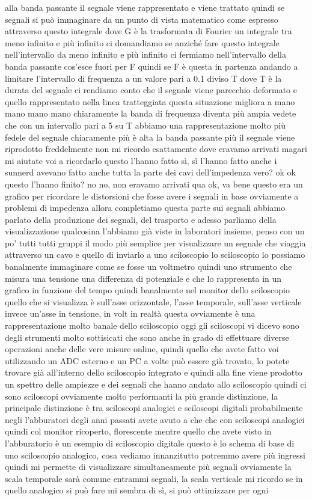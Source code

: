 {alla banda passante il segnale viene rappresentato e viene trattato quindi se segnali si può immaginare da un punto di vista matematico come espresso attraverso questo integrale dove G è la trasformata di Fourier un integrale tra meno infinito e più infinito ci domandiamo se anziché fare questo integrale nell'intervallo da meno infinito e più infinito ci fermiamo nell'intervallo della banda passante cos'esce fuori per F quindi se F è questa in partenza andando a limitare l'intervallo di frequenza a un valore pari a 0.1 diviso T dove T è la durata del segnale ci rendiamo conto che il segnale viene parecchio deformato e quello rappresentato nella linea tratteggiata questa situazione migliora a mano mano mano mano chiaramente la banda di frequenza diventa più ampia vedete che con un intervallo pari a 5 su T abbiamo una rappresentazione molto più fedele del segnale chiaramente più è alta la banda passante più il segnale viene riprodotto freddelmente non mi ricordo esattamente dove eravamo arrivati magari mi aiutate voi a ricordarlo questo l'hanno fatto sì, sì l'hanno fatto anche i sunnerd avevano fatto anche tutta la parte dei cavi dell'impedenza vero? ok ok questo l'hanno finito? no no, non eravamo arrivati qua ok, va bene questo era un grafico per ricordare le distorsioni che fosse avere i segnali in base ovviamente a problemi di impedenza allora completiamo questa parte sui segnali abbiamo parlato della produzione dei segnali, del trasporto e adesso parliamo della visualizzazione qualcosina l'abbiamo già viste in laboratori insieme, penso con un po' tutti tutti gruppi il modo più semplice per visualizzare un segnale che viaggia attraverso un cavo e quello di inviarlo a uno sciloscopio lo sciloscopio lo possiamo banalmente immaginare come se fosse un voltmetro quindi uno strumento che misura una tensione una differenza di potenziale e che lo rappresenta in un grafico in funzione del tempo quindi banalmente nel monitor dello sciloscopio quello che si visualizza è sull'asse orizzontale, l'asse temporale, sull'asse verticale invece un'asse in tensione, in volt in realtà questa ovviamente è una rappresentazione molto banale dello sciloscopio oggi gli sciloscopi vi dicevo sono degli strumenti molto sottisicati che sono anche in grado di effettuare diverse operazioni anche delle vere misure online, quindi quello che avete fatto voi utilizzando un ADC esterno e un PC a volte può essere già trovato, lo potete trovare già all'interno dello sciloscopio integrato e quindi alla fine viene prodotto un spettro delle ampiezze e dei segnali che hanno andato allo sciloscopio quindi ci sono sciloscopi ovviamente molto performanti la più grande distinzione, la principale distinzione è tra sciloscopi analogici e sciloscopi digitali probabilmente negli l'abburatori degli anni passati avete avuto a che che con sciloscopi analogici quindi col monitor ricoperto, florescente mentre quello che avete visto in l'abburatorio è un esempio di sciloscopio digitale questo è lo schema di base di uno sciloscopio analogico, cosa vediamo innanzitutto potremmo avere più ingressi quindi mi permette di visualizzare simultaneamente più segnali ovviamente la scala temporale sarà comune entrammi segnali, la scala verticale mi ricordo se in quello analogico si può fare mi sembra di sì, si può ottimizzare per ogni }
